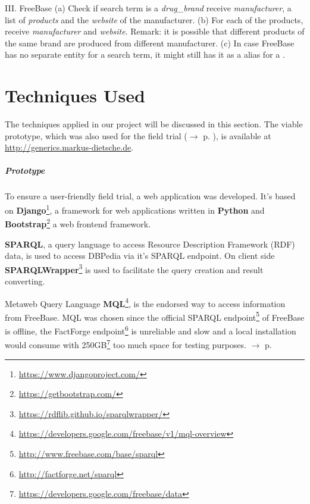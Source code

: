 \documentclass[11pt,titlepage,oneside,openany]{book}
\begin{document}
III. FreeBase
(a) Check if search term is a \textit{drug\_brand} receive \textit{manufacturer}, a list of \textit{products} and the \textit{website} of the manufacturer.
(b) For each of the products, receive \textit{manufacturer} and \textit{website}. 
Remark: it is possible that different products of the same brand are produced from different manufacturer.
(c) In case FreeBase has no separate entity for a search term, it might still has it as a alias for a .


\chapter{Techniques Used}
\label{cha:technique}



The techniques applied in our project will be discussed in this section. The viable prototype, which was also used for the field trial ($\rightarrow$ p. \pageref{field_trial}), is available at \url{http://generics.markus-dietsche.de}.

\paragraph{Prototype}
\label{prototype}


To ensure a user-friendly field trial, a web application was developed. It's based on 
\textbf{Django}\footnote{\url{https://www.djangoproject.com/}}, a framework for web applications written in \textbf{Python} and \textbf{Bootstrap}\footnote{\url{https://getbootstrap.com/}} a web frontend framework.

\label{sparql}
\textbf{SPARQL}, a query language to access Resource Description Framework (RDF) data, is used to access DBPedia via it's SPARQL endpoint. On client side \textbf{SPARQLWrapper}\footnote{\url{https://rdflib.github.io/sparqlwrapper/}} is used to facilitate the query creation and result converting. 

\label{mql}
Metaweb Query Language \textbf{MQL}\footnote{\url{https://developers.google.com/freebase/v1/mql-overview}}, is the endorsed way to access information from FreeBase. MQL was chosen since the official SPARQL endpoint\footnote{\url{http://www.freebase.com/base/sparql}} of FreeBase is offline, the FactForge endpoint\footnote{\url{http://factforge.net/sparql}} is unreliable and slow and a local installation would consume with 250GB\footnote{\url{https://developers.google.com/freebase/data}} too much space for testing purposes. $\rightarrow$ p. \pageref{}
\end{document}
